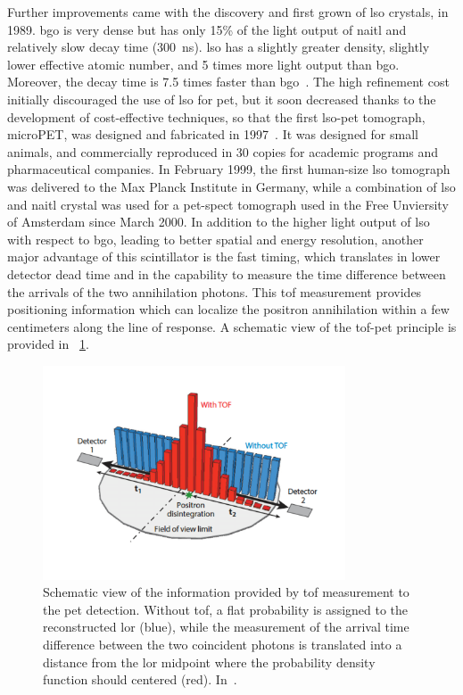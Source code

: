 Further improvements came with the discovery and first grown of \gls{lso} crystals, in 1989. \gls{bgo} is very dense but has only 15\% of the light output of \gls{naitl} and relatively slow decay time (300~ns). \gls{lso} has a slightly greater density, slightly lower effective atomic number, and 5 times more light output than \gls{bgo}. Moreover, the decay time is 7.5 times faster than \gls{bgo}~\parencite{Melcher1992}. The high refinement cost initially discouraged the use of \gls{lso} for \gls{pet}, but it soon decreased thanks to the development of cost-effective techniques, so that the first \gls{lso}-\gls{pet} tomograph, microPET, was designed and fabricated in 1997~\parencite{Cherry1997}. It was designed for small animals, and commercially reproduced in 30 copies for academic programs and pharmaceutical companies. In February 1999, the first human-size \gls{lso} tomograph was delivered to the Max Planck Institute in Germany, while a combination of \gls{lso} and \gls{naitl} crystal was used for a \gls{pet}-\gls{spect} tomograph used in the Free Unviersity of Amsterdam since March 2000. 
In addition to the higher light output of \gls{lso} with respect to \gls{bgo}, leading to better spatial and energy resolution, another major advantage of this scintillator is the fast timing, which translates in lower detector dead time and in the capability to measure the time difference between the arrivals of the two annihilation photons. This \gls{tof} measurement provides positioning information which can localize the positron annihilation within a few centimeters along the line of response. A schematic view of the \gls{tof}-\gls{pet} principle is provided in \figurename~\ref{chap1::fig::NM_PET_TOF}. 

\begin{figure}[!htbp]
\centering
\includegraphics[width=0.8\textwidth]{03_GraphicFiles/chapter1_Introduction/PET_TOF.pdf}
\caption{Schematic view of the information provided by \gls{tof} measurement to the \gls{pet} detection. Without \gls{tof}, a flat probability is assigned to the reconstructed \gls{lor} (blue), while the measurement of the arrival time difference between the two coincident photons is translated into a distance from the \gls{lor} midpoint where the probability density function should centered (red). In~\cite{Vaquero2015}.}
\label{chap1::fig::NM_PET_TOF}
\end{figure}   

